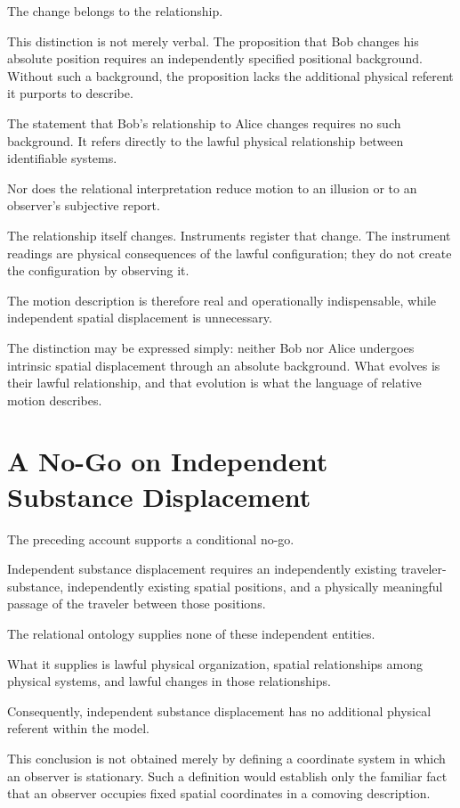 \documentclass[12pt,onecolumn]{article}
\begin{document}
The change belongs to the relationship.

This distinction is not merely verbal. The proposition that Bob changes his absolute position requires an independently specified positional background. Without such a background, the proposition lacks the additional physical referent it purports to describe.

The statement that Bob's relationship to Alice changes requires no such background. It refers directly to the lawful physical relationship between identifiable systems.

Nor does the relational interpretation reduce motion to an illusion or to an observer's subjective report.

The relationship itself changes. Instruments register that change. The instrument readings are physical consequences of the lawful configuration; they do not create the configuration by observing it.

The motion description is therefore real and operationally indispensable, while independent spatial displacement is unnecessary.

The distinction may be expressed simply: neither Bob nor Alice undergoes intrinsic spatial displacement through an absolute background. What evolves is their lawful relationship, and that evolution is what the language of relative motion describes.

\section{A No-Go on Independent Substance Displacement}

The preceding account supports a conditional no-go.

Independent substance displacement requires an independently existing traveler-substance, independently existing spatial positions, and a physically meaningful passage of the traveler between those positions.

The relational ontology supplies none of these independent entities.

What it supplies is lawful physical organization, spatial relationships among physical systems, and lawful changes in those relationships.

Consequently, independent substance displacement has no additional physical referent within the model.

This conclusion is not obtained merely by defining a coordinate system in which an observer is stationary. Such a definition would establish only the familiar fact that an observer occupies fixed spatial coordinates in a comoving description.
\end{document}
